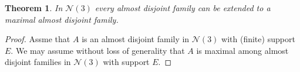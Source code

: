 \documentclass[12pt,notitlepage]{amsart}
\newtheorem{theorem}{Theorem}
\begin{document}
\begin{theorem}
In $\mathcal{N}(3)$ every almost disjoint family can be extended to a maximal almost disjoint family.
\end{theorem}

\begin{proof}
Assme that $A$ is an almost disjoint family in $\mathcal{N}(3)$ with (finite) support $E$.  We may assume without loss of generality that $A$ is maximal among almost disjoint families in $\mathcal{N}(3)$ with support $E$.
\end{proof}
\end{document}

